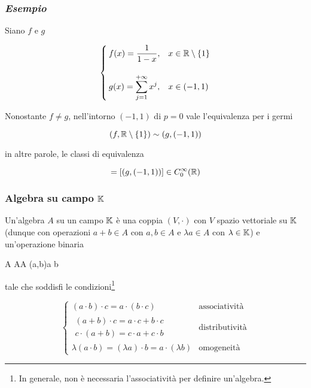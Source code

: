 \subsubsection{\textit{Esempio}}

Siano $ f $ e $ g $

\begin{equation}
	\begin{cases}
		f(x) = \dfrac{1}{1-x}, & x \in \mathbb{R} \setminus \{1\}\\\\
		g(x) = \displaystyle\sum_{j=1}^{+\infty} x^{j}, & x \in (-1,1)
	\end{cases}
\end{equation}

Nonostante $ f\neq g $, nell'intorno $ (-1,1) $ di $ p=0 $ vale l'equivalenza per i germi

\begin{equation}
	(f,\mathbb{R} \setminus \{1\}) \sim (g,(-1,1))
\end{equation}

in altre parole, le classi di equivalenza

\begin{equation}
	[(f,\R \setminus \{1\})] = [(g,(-1,1))] \in C_{0}^{\infty}(\R)
\end{equation}

\subsubsection{Algebra su campo $ \mathbb{K} $}

Un'algebra $ A $ su un campo $ \mathbb{K} $ è una coppia $ (V,\cdot) $ con $ V $ spazio vettoriale su $ \mathbb{K} $ (dunque con operazioni $ a+b \in A $ con $ a,b \in A $ e $ \lambda a \in A $ con $ \lambda \in \mathbb{K} $) e un'operazione binaria

\map{\cdot}%
	{A \times A}{A}%
	{(a,b)}{a \cdot b}

tale che soddisfi le condizioni\footnote{%
	In generale, non è necessaria l'associatività per definire un'algebra.}

\begin{equation}
	\begin{cases}
		(a \cdot b) \cdot c = a \cdot (b \cdot c) & \text{associatività}\\
		\begin{split}
			(a + b) \cdot c = a \cdot c + b \cdot c\\
			c \cdot (a + b) = c \cdot a + c \cdot b
		\end{split} & \text{distributività}\\
	\lambda (a \cdot b) = (\lambda a) \cdot b = a \cdot (\lambda b) & \text{omogeneità}
	\end{cases}
\end{equation}

